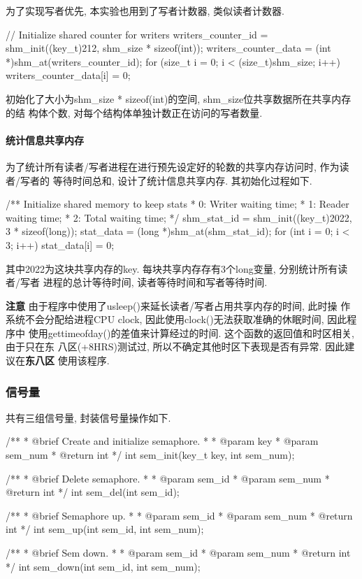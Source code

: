 为了实现写者优先, 本实验也用到了写者计数器, 类似读者计数器.
\begin{code}[caption={写者计数器}]
    // Initialize shared counter for writers
    writers_counter_id = shm_init((key_t)212, shm_size * sizeof(int));
    writers_counter_data = (int *)shm_at(writers_counter_id);
    for (size_t i = 0; i < (size_t)shm_size; i++) {
    writers_counter_data[i] = 0;
    }
\end{code}
初始化了大小为shm\_size * sizeof(int)的空间, shm\_size位共享数据所在共享内存的结
构体个数, 对每个结构体单独计数正在访问的写者数量.

\paragraph{统计信息共享内存}
为了统计所有读者/写者进程在进行预先设定好的轮数的共享内存访问时, 作为读者/写者的
等待时间总和, 设计了统计信息共享内存. 其初始化过程如下.
\begin{code}
    /** Initialize shared memory to keep stats
    * 0: Writer waiting time;
    * 1: Reader waiting time;
    * 2: Total waiting time;
    */
    shm_stat_id = shm_init((key_t)2022, 3 * sizeof(long));
    stat_data = (long *)shm_at(shm_stat_id);
    for (int i = 0; i < 3; i++) {
    stat_data[i] = 0;
    }

\end{code}
其中2022为这块共享内存的key. 每块共享内存存有3个long变量, 分别统计所有读者/写者
进程的总计等待时间, 读者等待时间和写者等待时间.

\textbf{注意} 由于程序中使用了usleep()来延长读者/写者占用共享内存的时间, 此时操
作系统不会分配给进程CPU clock, 因此使用clock()无法获取准确的休眠时间, 因此程序中
使用gettimeofday()的差值来计算经过的时间. 这个函数的返回值和时区相关, 由于只在东
八区(+8HRS)测试过, 所以不确定其他时区下表现是否有异常. 因此建议在\textbf{东八区}
使用该程序.

\subsubsection{信号量}
共有三组信号量, 封装信号量操作如下.
\begin{code}
    /**
    * @brief Create and initialize semaphore.
    *
    * @param key
    * @param sem_num
    * @return int
    */
    int sem_init(key_t key, int sem_num);

    /**
    * @brief Delete semaphore.
    *
    * @param sem_id
    * @param sem_num
    * @return int
    */
    int sem_del(int sem_id);

    /**
    * @brief Semaphore up.
    *
    * @param sem_id
    * @param sem_num
    * @return int
    */
    int sem_up(int sem_id, int sem_num);

    /**
    * @brief Sem down.
    *
    * @param sem_id
    * @param sem_num
    * @return int
    */
    int sem_down(int sem_id, int sem_num);

\end{code}

